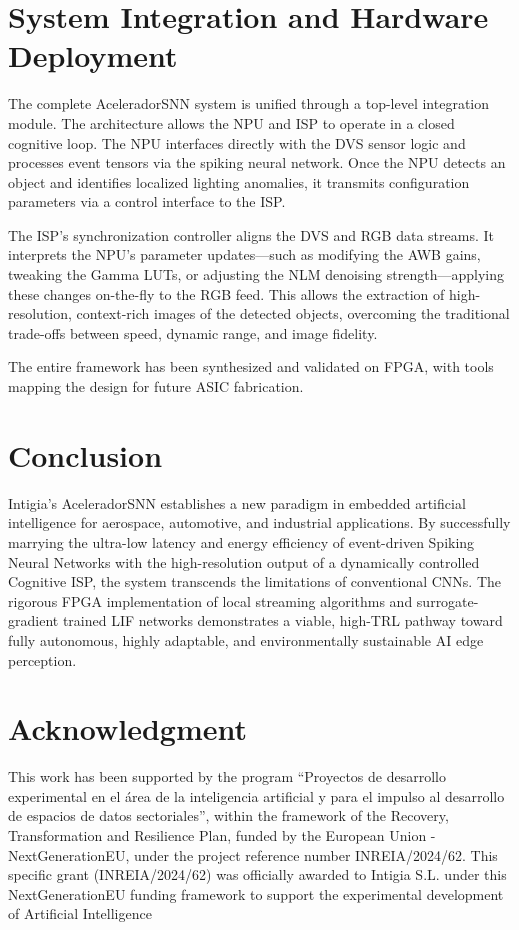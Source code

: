 \documentclass[conference]{IEEEtran}
\begin{document}
\section{System Integration and Hardware Deployment}
The complete AceleradorSNN system is unified through a top-level integration module. The architecture allows the NPU and ISP to operate in a closed cognitive loop. The NPU interfaces directly with the DVS sensor logic and processes event tensors via the spiking neural network. Once the NPU detects an object and identifies localized lighting anomalies, it transmits configuration parameters via a control interface to the ISP. 

The ISP's synchronization controller aligns the DVS and RGB data streams. It interprets the NPU's parameter updates—such as modifying the AWB gains, tweaking the Gamma LUTs, or adjusting the NLM denoising strength—applying these changes on-the-fly to the RGB feed. This allows the extraction of high-resolution, context-rich images of the detected objects, overcoming the traditional trade-offs between speed, dynamic range, and image fidelity. 

The entire framework has been synthesized and validated on FPGA, with tools mapping the design for future ASIC fabrication.

\section{Conclusion}
Intigia's AceleradorSNN establishes a new paradigm in embedded artificial intelligence for aerospace, automotive, and industrial applications. By successfully marrying the ultra-low latency and energy efficiency of event-driven Spiking Neural Networks with the high-resolution output of a dynamically controlled Cognitive ISP, the system transcends the limitations of conventional CNNs. The rigorous FPGA implementation of local streaming algorithms and surrogate-gradient trained LIF networks demonstrates a viable, high-TRL pathway toward fully autonomous, highly adaptable, and environmentally sustainable AI edge perception.

\section*{Acknowledgment}
This work has been supported by the program ``Proyectos de desarrollo experimental en el área de la inteligencia artificial y para el impulso al desarrollo de espacios de datos sectoriales'', within the framework of the Recovery, Transformation and Resilience Plan, funded by the European Union - NextGenerationEU, under the project reference number INREIA/2024/62.
This specific grant (INREIA/2024/62) was officially awarded to Intigia S.L. under this NextGenerationEU funding framework to support the experimental development of Artificial Intelligence
\end{document}

